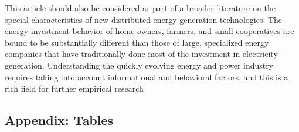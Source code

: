 \documentclass[12pt]{article}
\begin{document}
This article should also be considered as part of a broader literature on the special characteristics of new distributed energy generation technologies. The energy investment behavior of home owners, farmers, and small cooperatives are bound to be substantially different than those of large, specialized energy companies that have traditionally done most of the investment in electricity generation. Understanding the quickly evolving energy and power industry requires taking into account informational and behavioral factors, and this is a rich field for further empirical research

\begin{spacing}{1}



\FloatBarrier

\appendix
\section{Appendix: Tables}


\end{spacing}
\end{document}
